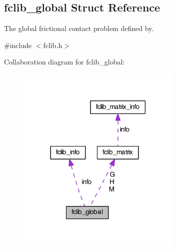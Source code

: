 \hypertarget{structfclib__global}{\subsection{fclib\-\_\-global Struct Reference}
\label{structfclib__global}
}


The global frictional contact problem defined by.  




{\ttfamily \#include $<$fclib.\-h$>$}



Collaboration diagram for fclib\-\_\-global\-:\nopagebreak
\begin{figure}[H]
\begin{center}
\leavevmode
\includegraphics[width=222pt]{structfclib__global__coll__graph}
\end{center}
\end{figure}
